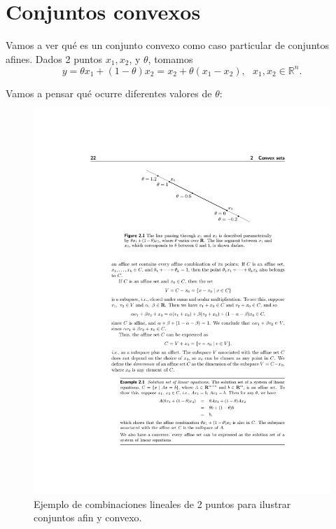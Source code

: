 

\section{Conjuntos convexos}

Vamos a ver qué es un conjunto convexo como caso particular de conjuntos afines.
Dados 2 puntos $x_1,x_2$, y $\theta$, tomamos
\[
y = \theta x_1 + (1-\theta)x_2 = x_2 + \theta (x_1-x_2),\ \ \  x_1,x_2\in\mathbb{R}^n.
\]

Vamos a pensar qué ocurre diferentes valores de $\theta$:


\begin{figure}[h]
\begin{center}
\includegraphics[scale=0.8]{pdf/berrendero/tema2/_combinacion}
\caption{Ejemplo de combinaciones lineales de 2 puntos para ilustrar conjuntos afin y convexo.}
\label{sec2:comb}
\end{center}
\end{figure}


